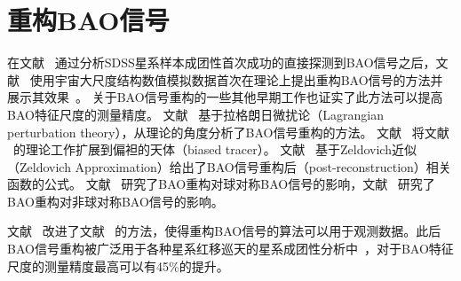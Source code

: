 \section{重构BAO信号}
\label{sec:baorecon}

在文献 ~通过分析SDSS星系样本成团性首次成功的直接探测到BAO信号之后，文献 ~使用宇宙大尺度结构数值模拟数据首次在理论上提出重构BAO信号的方法并展示其效果~\cite{Eisenstein2007b,Padmanabhan2009}。
关于BAO信号重构的一些其他早期工作也证实了此方法可以提高BAO特征尺度的测量精度。
文献 ~基于拉格朗日微扰论（Lagrangian perturbation theory），从理论的角度分析了BAO信号重构的方法。
文献 ~将文献 ~的理论工作扩展到偏袒的天体（biased tracer）。
文献 ~基于Zeldovich近似（Zeldovich Approximation）给出了BAO信号重构后（post-reconstruction）相关函数的公式。
文献 ~研究了BAO重构对球对称BAO信号的影响，文献 ~研究了BAO重构对非球对称BAO信号的影响。

文献 ~改进了文献 ~的方法，使得重构BAO信号的算法可以用于观测数据。此后BAO信号重构被广泛用于各种星系红移巡天的星系成团性分析中~\cite{Anderson2012,Anderson2014439,Kazin2014,Tojeiro2014,Burden2015,Ross2015}，对于BAO特征尺度的测量精度最高可以有45\%的提升。

